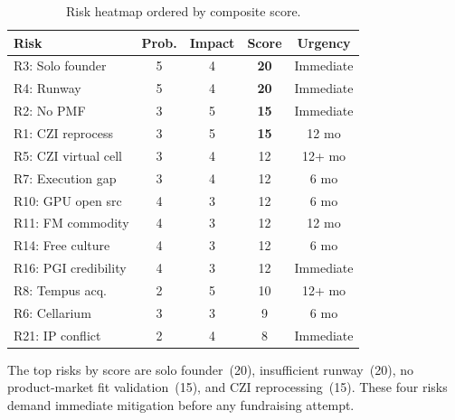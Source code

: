 \documentclass[10pt,twocolumn,letterpaper]{article}
\begin{document}
\begin{table}[h]
\centering
\small
\begin{tabular}{@{}lcccc@{}}
\toprule
\textbf{Risk} & \textbf{Prob.} & \textbf{Impact} & \textbf{Score} & \textbf{Urgency} \\
\midrule
R3: Solo founder & 5 & 4 & \textbf{20} & Immediate \\
R4: Runway & 5 & 4 & \textbf{20} & Immediate \\
R2: No PMF & 3 & 5 & \textbf{15} & Immediate \\
R1: CZI reprocess & 3 & 5 & \textbf{15} & 12 mo \\
R5: CZI virtual cell & 3 & 4 & 12 & 12+ mo \\
R7: Execution gap & 3 & 4 & 12 & 6 mo \\
R10: GPU open src & 4 & 3 & 12 & 6 mo \\
R11: FM commodity & 4 & 3 & 12 & 12 mo \\
R14: Free culture & 4 & 3 & 12 & 6 mo \\
R16: PGI credibility & 4 & 3 & 12 & Immediate \\
R8: Tempus acq. & 2 & 5 & 10 & 12+ mo \\
R6: Cellarium & 3 & 3 & 9 & 6 mo \\
R21: IP conflict & 2 & 4 & 8 & Immediate \\
\bottomrule
\end{tabular}
\caption{Risk heatmap ordered by composite score.}
\label{tab:heatmap}
\end{table}

The top risks by score are solo founder~(20), insufficient runway~(20), no
product-market fit validation~(15), and CZI reprocessing~(15). These four risks
demand immediate mitigation before any fundraising attempt.



\end{document}
